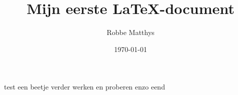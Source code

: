 \documentclass{article}
\title{Mijn eerste \LaTeX -document}
\author{Robbe Matthys}
\date{\today}
\begin{document}
	test
	een beetje verder werken en proberen enzo
	eend
\end{document}
